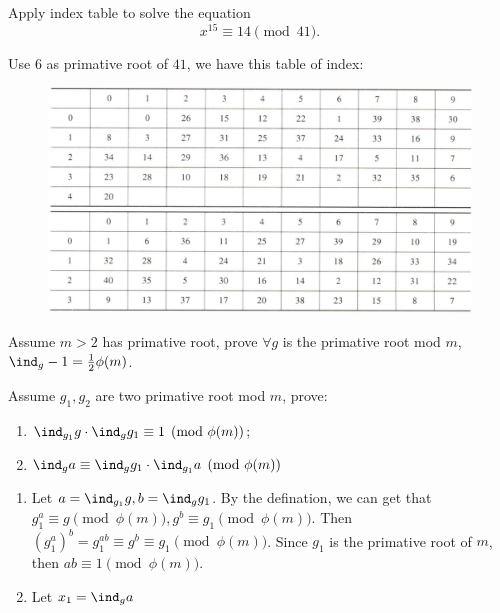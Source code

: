 \documentclass{ctexart}
\begin{document}
\begin{problem}\label{pro:3}
  Apply index table to solve the equation \[
    x^{15 } \equiv 14 \pmod{41}.
  \]
\end{problem}
\begin{solution}
  Use \(6\) as primative root of \(41\), we have this table of index:
  \begin{figure}
    \centering
    \includegraphics{./mod41.png}
  \end{figure}

\end{solution}

\begin{problem}\label{pro:4}
  Assume \(m >2\) has primative root, prove \(\forall g\) is the primative root mod \(m\),
  \(\ind_g -1=\frac{1}{2}\phi(m)\).
\end{problem}

\begin{problem}\label{pro:5}
  Assume \(g_1,g_2\) are two primative root mod \(m\), prove:
  \begin{enumerate}
    \item \(\ind_{g_1}g \cdot \ind_{g}g_1 \equiv 1 \pmod{\phi(m)}\);
    \item \(\ind_g a \equiv \ind_g g_1 \cdot\ind_{g_1}a \pmod{\phi(m)}\)
  \end{enumerate}
\end{problem}
\begin{solution}
  \begin{enumerate}
    \item Let \(a=\ind_{g_1}g,b=\ind_{g}g_1\).
      By the defination, we can get that \(g_1^a \equiv g \pmod{\phi(m)}, g^b \equiv g_1 \pmod{\phi(m)}\).
      Then \((g_1^{a})^b = g_1^{ab}\equiv g^b \equiv g_1 \pmod{\phi(m)}\).
      Since \(g_1\) is the primative root of \(m\), then \(ab \equiv 1 \pmod{\phi(m)}\).
    \item Let \(x_1=\ind_{g} a\)
  \end{enumerate}

\end{solution}
\end{document}

